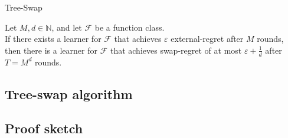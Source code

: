 \documentclass[aspectratio=169,xcolor=dvipsnames,t]{beamer}
\begin{document}

\begin{frame}[label=current]{Tree-Swap}
    \begin{theorem}
        Let $M,d\in\mathbb{N}$, and let $\mathcal{F}$ be a function class.\\
        If there exists a learner for $\mathcal{F}$ that achieves $\varepsilon$ \color{MediumRed}external-regret \color{black} after $M$ rounds, then there is a learner for $\mathcal{F}$ that achieves \color{MediumGreen}swap-regret \color{black} of at most $\varepsilon+\frac{1}{d}$ after $T=M^d$ rounds.
    \end{theorem}
\end{frame}

\subsection{Tree-swap algorithm}
\subsection{Proof sketch}
\end{document}
